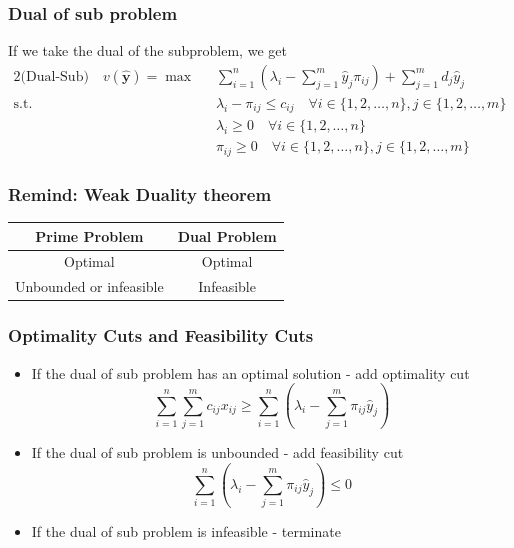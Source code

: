 \documentclass[10pt]{beamer}
\begin{document}
	\begin{frame}
		\frametitle{Dual of sub problem}
		 If we take the dual of the subproblem, we get
		\begin{alignat*}{2}
			\text{(Dual-Sub)} \quad v(\hat{\mathbf{y}}) = \max \quad & \sum_{i = 1}^n (\lambda_i - \sum_{j = 1}^m \hat{y}_j \pi_{ij}) + \sum_{j = 1}^m d_j \hat{y}_j \\
			\text{s.t.} \quad & \lambda_i - \pi_{ij} \le c_{ij} \quad \forall i \in \{1, 2, \ldots, n\}, j \in \{1, 2, \ldots, m\}\\
			& \lambda_i \ge 0 \quad \forall i \in \{1, 2, \ldots, n\}\\
			& \pi_{ij} \ge 0 \quad \forall i \in \{1, 2, \ldots, n\}, j \in \{1, 2, \ldots, m\}
		\end{alignat*}
	\end{frame}

	\begin{frame}
		\frametitle{Remind: Weak Duality theorem}
		\begin{table}
			\centering
			\begin{tabular}{c|c}
				Prime Problem & Dual Problem\\
				\hline
				Optimal & Optimal\\
				Unbounded or infeasible & Infeasible
			\end{tabular}
		\end{table}
	\end{frame}

	\begin{frame}
		\frametitle{Optimality Cuts and Feasibility Cuts}
		\begin{itemize}
			\item If the dual of sub problem has an optimal solution - add optimality cut
			\begin{equation*}
				\sum_{i = 1}^n \sum_{j = 1}^m c_{ij} x_{ij} \ge \sum_{i = 1}^n (\lambda_i - \sum_{j = 1}^m \pi_{ij} \hat{y}_j)
			\end{equation*}

			\item If the dual of sub problem is unbounded - add feasibility cut
			\begin{equation*}
				\sum_{i = 1}^n (\lambda_i - \sum_{j = 1}^m \pi_{ij} \hat{y}_j) \le 0
			\end{equation*}
			
			\item If the dual of sub problem is infeasible - terminate

		\end{itemize}
	\end{frame}
\end{document}

